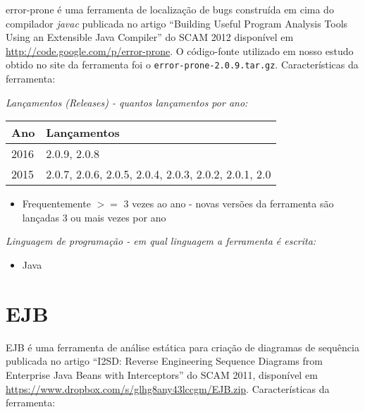 error-prone é uma ferramenta de localização de bugs construída em cima do
compilador {\it javac} publicada no artigo ``Building Useful Program Analysis
Tools Using an Extensible Java Compiler'' do SCAM 2012 disponível em
\url{http://code.google.com/p/error-prone}. O código-fonte utilizado em nosso
estudo obtido no site da ferramenta foi o \texttt{error-prone-2.0.9.tar.gz}.
Características da ferramenta:

\begin{description}

  \item {\it Lançamentos ({\it Releases}) - quantos lançamentos por ano:}
    \begin{table}[h!]
      \centering
      \begin{tabular}{| l | l |}
        \hline
        Ano  & Lançamentos                                          \\
        \hline
        2016 & 2.0.9, 2.0.8                                         \\
        2015 & 2.0.7, 2.0.6, 2.0.5, 2.0.4, 2.0.3, 2.0.2, 2.0.1, 2.0 \\
        \hline
      \end{tabular}
    \end{table}
    \begin{itemize}
      \item Frequentemente $>=$ 3 vezes ao ano - novas versões da ferramenta são lançadas 3 ou mais vezes por ano
    \end{itemize}

  \item {\it Linguagem de programação - em qual linguagem a ferramenta é escrita:}
    \begin{itemize}
      \item Java
    \end{itemize}

\end{description}

\section{EJB}

EJB é uma ferramenta de análise estática para criação de diagramas de sequência
publicada no artigo ``I2SD: Reverse Engineering Sequence Diagrams from
Enterprise Java Beans with Interceptors'' do SCAM 2011, disponível em
\url{https://www.dropbox.com/s/glhg8any43lccgm/EJB.zip}. Características da
ferramenta:

